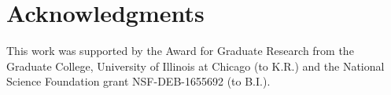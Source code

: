 \documentclass[fleqn,10pt,lineno]{wlpeerj}
\begin{document}



\section*{Acknowledgments}

This work was supported by the Award for Graduate Research from the Graduate College, University of Illinois at Chicago (to K.R.) and the National Science Foundation grant NSF-DEB-1655692 (to B.I.).

\clearpage
%

\end{document}
